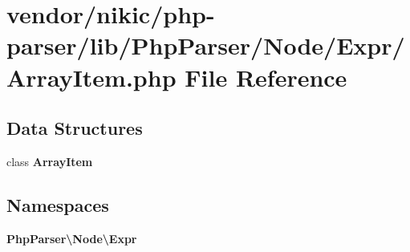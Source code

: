 \section{vendor/nikic/php-\/parser/lib/\+Php\+Parser/\+Node/\+Expr/\+Array\+Item.php File Reference}
\label{_array_item_8php}
\subsection*{Data Structures}
\begin{DoxyCompactItemize}
\item 
class {\bf Array\+Item}
\end{DoxyCompactItemize}
\subsection*{Namespaces}
\begin{DoxyCompactItemize}
\item 
 {\bf Php\+Parser\textbackslash{}\+Node\textbackslash{}\+Expr}
\end{DoxyCompactItemize}
